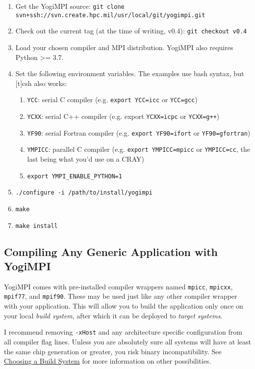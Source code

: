 \documentclass{article}
\begin{document}
\begin{enumerate}
\item Get the YogiMPI source: \texttt{git clone svn+ssh://svn.create.hpc.mil/usr/local/git/yogimpi.git}
\item Check out the current tag (at the time of writing, v0.4): \texttt{git checkout v0.4}
\item Load your chosen compiler and MPI distribution. YogiMPI also requires Python >= 3.7.
\item Set the following environment variables.  The examples use bash syntax, but [t]csh also works:
\begin{enumerate}
\item \texttt{YCC}: serial C compiler (e.g. \texttt{export YCC=icc} or \texttt{YCC=gcc})
\item \texttt{YCXX}: serial C++ compiler (e.g. export \texttt{YCXX=icpc} or \texttt{YCXX=g++})
\item \texttt{YF90}: serial Fortran compiler (e.g. \texttt{export YF90=ifort} or \texttt{YF90=gfortran})
\item \texttt{YMPICC}: parallel C compiler (e.g. \texttt{export YMPICC=mpicc} or \texttt{YMPICC=cc}, the last being what you'd use on a CRAY)
\item \texttt{export YMPI\_ENABLE\_PYTHON=1}
\end{enumerate}
\item \texttt{./configure -i /path/to/install/yogimpi}
\item \texttt{make}
\item \texttt{make install}
\end{enumerate}

\subsection{Compiling Any Generic Application with YogiMPI}
\label{generic:compile}
YogiMPI comes with pre-installed compiler wrappers named \texttt{mpicc}, \texttt{mpicxx}, \texttt{mpif77}, and \texttt{mpif90}.  These may be used just like any other compiler wrapper with your application.  This will allow you to build the application only once on your local \textit{build system}, after which it can be deployed to \textit{target systems}.

I recommend removing \texttt{-xHost} and any architecture specific configuration from all compiler flag lines. Unless you are absolutely sure all systems will have at least the same chip generation or greater, you risk binary incompatibility. See \hyperref[choosebuild]{Choosing a Build System} for more information on other possibilities.
\end{document}
